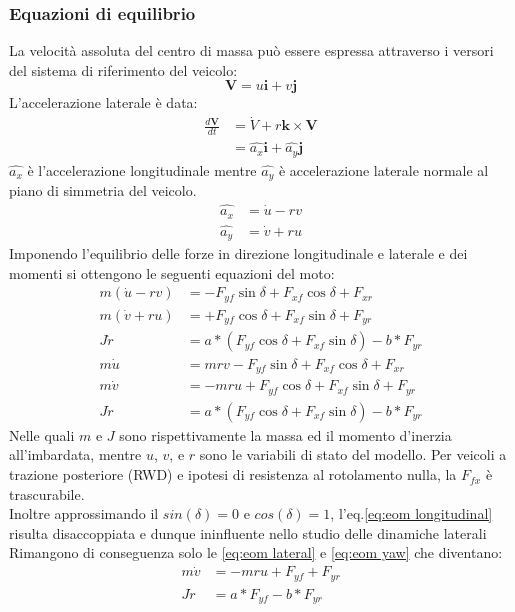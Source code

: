 \subsubsection{Equazioni di equilibrio}
La velocità assoluta del centro di massa può essere espressa attraverso i versori del sistema di riferimento del veicolo:\\
\begin{equation}
\textbf{V} = u\textbf{i}+v\textbf{j}
\end{equation}
L'accelerazione laterale è data:\\
\begin{equation}
\begin{split}
\frac{d\textbf{V}}{dt} & = \textbf{$\dot V$}+r\textbf{k}\times\textbf{V}\\
 & = \hat{a_x}\textbf{i}+\hat{a_y}\textbf{j}
\end{split}
\end{equation}
$\hat{a_x}$ è l'accelerazione longitudinale mentre $\hat{a_y}$ è accelerazione laterale normale al piano di simmetria del veicolo.\\
\begin{align}
\hat{a_x} & = \dot u - rv\\
\hat{a_y} & = \dot v + ru
\end{align}
Imponendo l'equilibrio delle forze in direzione longitudinale e laterale e dei momenti si ottengono le seguenti equazioni del moto:
\begin{align}
m(\dot u- rv) & = -F_{yf} \sin \delta+F_{xf} \cos \delta+F_{xr}\\
m(\dot v+ ru) & = +F_{yf} \cos \delta+F_{xf} \sin \delta+F_{yr}\\
J\dot r & = a*(F_{yf} \cos \delta+F_{xf} \sin \delta)-b*F_{yr}\\[3mm]
m\dot u & =  mrv-F_{yf} \sin \delta+F_{xf} \cos \delta+F_{xr} \label{eq:eom longitudinal}\\
m\dot v & = -mru+F_{yf} \cos \delta+F_{xf} \sin \delta+F_{yr} \label{eq:eom lateral}\\
J\dot r & = a*(F_{yf} \cos \delta+F_{xf} \sin\delta)-b*F_{yr} \label{eq:eom yaw}
\end{align}
Nelle quali $m$ e $J$ sono rispettivamente la massa ed il momento d'inerzia all'imbardata, mentre $u$, $v$, e $r$ sono le variabili di stato del modello.
Per veicoli a trazione posteriore (RWD) e ipotesi di resistenza al rotolamento nulla, la $F_{fx}$ è trascurabile.\\
Inoltre approssimando il $sin(\delta)=0$ e $cos(\delta)=1$, l'eq.\ref{eq:eom longitudinal} 
risulta disaccoppiata e dunque ininfluente nello studio delle dinamiche laterali\\
Rimangono di conseguenza solo le \ref{eq:eom lateral} e \ref{eq:eom yaw} che diventano:
\begin{align}
m\dot v & = -mru+F_{yf}+F_{yr}\label{eq:eom lateral 2}\\
J\dot r & = a*F_{yf}-b*F_{yr}\label{eq:eom yaw 2}
\end{align}

